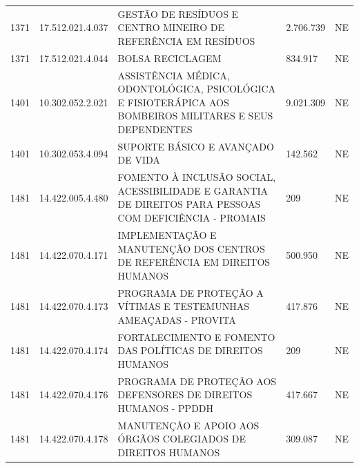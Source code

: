 \documentclass{article}
\begin{document}
\begin{longtable}[c]{m{1cm}|m{2cm}|m{10cm}|m{2cm}|m{1cm}}
\multicolumn{1}{C{1cm}|}{1371} & \multicolumn{1}{C{2cm}|}{17.512.021.4.037} & \multicolumn{1}{L{10cm}|}{GESTÃO DE RESÍDUOS E CENTRO MINEIRO DE REFERÊNCIA EM RESÍDUOS} & \multicolumn{1}{R{2cm}|}{2.706.739} & \multicolumn{1}{C{1cm}}{NE} \\
\multicolumn{1}{C{1cm}|}{1371} & \multicolumn{1}{C{2cm}|}{17.512.021.4.044} & \multicolumn{1}{L{10cm}|}{BOLSA RECICLAGEM} & \multicolumn{1}{R{2cm}|}{834.917} & \multicolumn{1}{C{1cm}}{NE} \\
\multicolumn{1}{C{1cm}|}{1401} & \multicolumn{1}{C{2cm}|}{10.302.052.2.021} & \multicolumn{1}{L{10cm}|}{ASSISTÊNCIA MÉDICA, ODONTOLÓGICA, PSICOLÓGICA E FISIOTERÁPICA AOS BOMBEIROS MILITARES E SEUS DEPENDENTES} & \multicolumn{1}{R{2cm}|}{9.021.309} & \multicolumn{1}{C{1cm}}{NE} \\
\multicolumn{1}{C{1cm}|}{1401} & \multicolumn{1}{C{2cm}|}{10.302.053.4.094} & \multicolumn{1}{L{10cm}|}{SUPORTE BÁSICO E AVANÇADO DE VIDA} & \multicolumn{1}{R{2cm}|}{142.562} & \multicolumn{1}{C{1cm}}{NE} \\
\multicolumn{1}{C{1cm}|}{1481} & \multicolumn{1}{C{2cm}|}{14.422.005.4.480} & \multicolumn{1}{L{10cm}|}{FOMENTO À INCLUSÃO SOCIAL, ACESSIBILIDADE E GARANTIA DE DIREITOS PARA PESSOAS COM DEFICIÊNCIA - PROMAIS} & \multicolumn{1}{R{2cm}|}{209} & \multicolumn{1}{C{1cm}}{NE} \\
\multicolumn{1}{C{1cm}|}{1481} & \multicolumn{1}{C{2cm}|}{14.422.070.4.171} & \multicolumn{1}{L{10cm}|}{IMPLEMENTAÇÃO E MANUTENÇÃO DOS CENTROS DE REFERÊNCIA EM DIREITOS HUMANOS} & \multicolumn{1}{R{2cm}|}{500.950} & \multicolumn{1}{C{1cm}}{NE} \\
\multicolumn{1}{C{1cm}|}{1481} & \multicolumn{1}{C{2cm}|}{14.422.070.4.173} & \multicolumn{1}{L{10cm}|}{PROGRAMA DE PROTEÇÃO A VÍTIMAS E TESTEMUNHAS AMEAÇADAS - PROVITA} & \multicolumn{1}{R{2cm}|}{417.876} & \multicolumn{1}{C{1cm}}{NE} \\
\multicolumn{1}{C{1cm}|}{1481} & \multicolumn{1}{C{2cm}|}{14.422.070.4.174} & \multicolumn{1}{L{10cm}|}{FORTALECIMENTO E FOMENTO DAS POLÍTICAS DE DIREITOS HUMANOS} & \multicolumn{1}{R{2cm}|}{209} & \multicolumn{1}{C{1cm}}{NE} \\
\multicolumn{1}{C{1cm}|}{1481} & \multicolumn{1}{C{2cm}|}{14.422.070.4.176} & \multicolumn{1}{L{10cm}|}{PROGRAMA DE PROTEÇÃO AOS DEFENSORES DE DIREITOS HUMANOS - PPDDH} & \multicolumn{1}{R{2cm}|}{417.667} & \multicolumn{1}{C{1cm}}{NE} \\
\multicolumn{1}{C{1cm}|}{1481} & \multicolumn{1}{C{2cm}|}{14.422.070.4.178} & \multicolumn{1}{L{10cm}|}{MANUTENÇÃO E APOIO AOS ÓRGÃOS COLEGIADOS DE DIREITOS HUMANOS} & \multicolumn{1}{R{2cm}|}{309.087} & \multicolumn{1}{C{1cm}}{NE} \\

\end{longtable}
\end{document}
